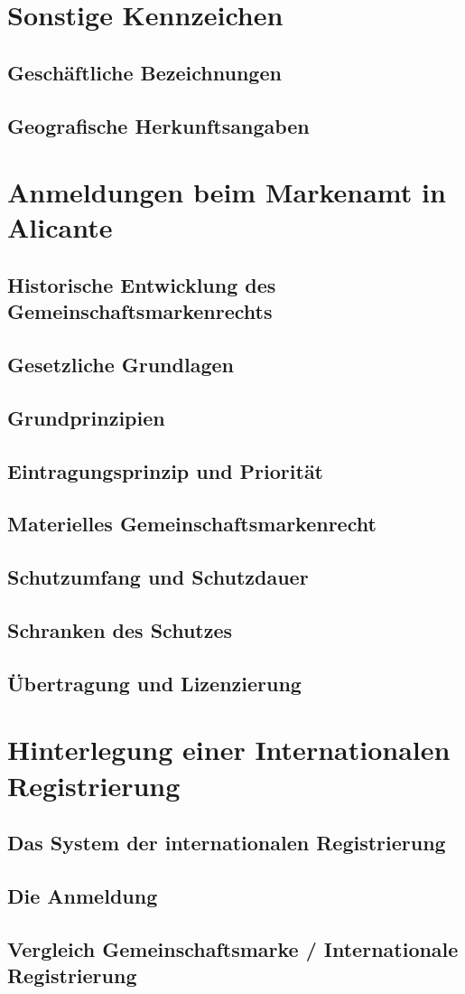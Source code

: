 \documentclass{report}
\begin{document}
\section{Sonstige Kennzeichen}
\subsection{Geschäftliche Bezeichnungen}
\subsection{Geografische Herkunftsangaben}
\section{Anmeldungen beim Markenamt in Alicante}
\subsection{Historische Entwicklung des Gemeinschaftsmarkenrechts}
\subsection{Gesetzliche Grundlagen}
\subsection{Grundprinzipien}
\subsection{Eintragungsprinzip und Priorität}
\subsection{Materielles Gemeinschaftsmarkenrecht}
\subsection{Schutzumfang und Schutzdauer}
\subsection{Schranken des Schutzes}
\subsection{Übertragung und Lizenzierung}
\section{Hinterlegung einer Internationalen Registrierung}
\subsection{Das System der internationalen Registrierung}
\subsection{Die Anmeldung}
\subsection{Vergleich Gemeinschaftsmarke / Internationale Registrierung}
\end{document}
